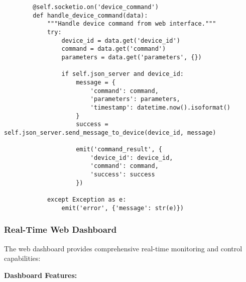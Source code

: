\documentclass[12pt,a4paper]{article}
\begin{document}
\begin{verbatim}
        @self.socketio.on('device_command')
        def handle_device_command(data):
            """Handle device command from web interface."""
            try:
                device_id = data.get('device_id')
                command = data.get('command')
                parameters = data.get('parameters', {})

                if self.json_server and device_id:
                    message = {
                        'command': command,
                        'parameters': parameters,
                        'timestamp': datetime.now().isoformat()
                    }
                    success = self.json_server.send_message_to_device(device_id, message)

                    emit('command_result', {
                        'device_id': device_id,
                        'command': command,
                        'success': success
                    })

            except Exception as e:
                emit('error', {'message': str(e)})
\end{verbatim}

\subsubsection{Real-Time Web Dashboard}

The web dashboard provides comprehensive real-time monitoring and control capabilities:

\textbf{Dashboard Features:}
\end{document}
